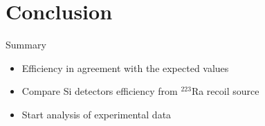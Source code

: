 \documentclass[10pt]{beamer}
\begin{document}
\section{Conclusion}
\begin{frame}{Summary}
	\centering
	\begin{itemize}
		\item Efficiency in agreement with the expected values
		\item Compare Si detectors efficiency from $^{223}$Ra recoil source
		\item Start analysis of experimental data
	\end{itemize}
\end{frame}

\end{document}
